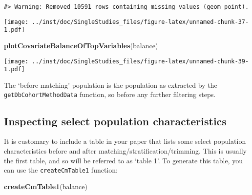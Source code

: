 \documentclass[]{article}
\newenvironment{Shaded}{\begin{snugshade}}{\end{snugshade}}
\newcommand{\KeywordTok}[1]{\textcolor[rgb]{0.13,0.29,0.53}{\textbf{#1}}}
\newcommand{\NormalTok}[1]{#1}
\begin{document}
\begin{verbatim}
#> Warning: Removed 10591 rows containing missing values (geom_point).
\end{verbatim}

\texttt{[image: ../inst/doc/SingleStudies\_files/figure-latex/unnamed-chunk-37-1.pdf]}

\begin{Shaded}
\begin{Highlighting}[]
\KeywordTok{plotCovariateBalanceOfTopVariables}\NormalTok{(balance)}
\end{Highlighting}
\end{Shaded}

\texttt{[image: ../inst/doc/SingleStudies\_files/figure-latex/unnamed-chunk-39-1.pdf]}

The `before matching' population is the population as extracted by the
\texttt{getDbCohortMethodData} function, so before any further filtering
steps.

\hypertarget{inspecting-select-population-characteristics}{%
\subsection{Inspecting select population
characteristics}\label{inspecting-select-population-characteristics}}

It is customary to include a table in your paper that lists some select
population characteristics before and after
matching/stratification/trimming. This is usually the first table, and
so will be referred to as `table 1'. To generate this table, you can use
the \texttt{createCmTable1} function:

\begin{Shaded}
\begin{Highlighting}[]
\KeywordTok{createCmTable1}\NormalTok{(balance)}
\end{Highlighting}
\end{Shaded}

\fontsize{6.5}{6.5}
\selectfont
\end{document}
